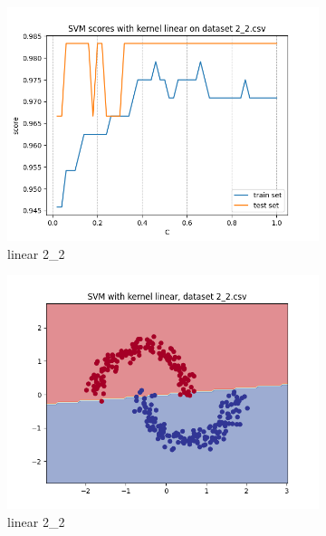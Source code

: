 \documentclass[12pt]{article}
\newcommand*{\subfigwidth}{0.24\textwidth}
\begin{document}
\begin{figure}[H]
\begin{subfigure}[t]{\subfigwidth}
        \includegraphics[width=\linewidth]{img/exp_1/svm/2_2/linear/scores.png}
        \caption{linear 2\_2}
    \end{subfigure}
    \hfill
    \begin{subfigure}[t]{\subfigwidth}
        \includegraphics[width=\linewidth]{img/exp_1/svm/2_2/linear/boundary.png}
        \caption{linear 2\_2}
    \end{subfigure}
    \hfill
    \begin{subfigure}[t]{\subfigwidth}

\end{subfigure}
\end{figure}
\end{document}
